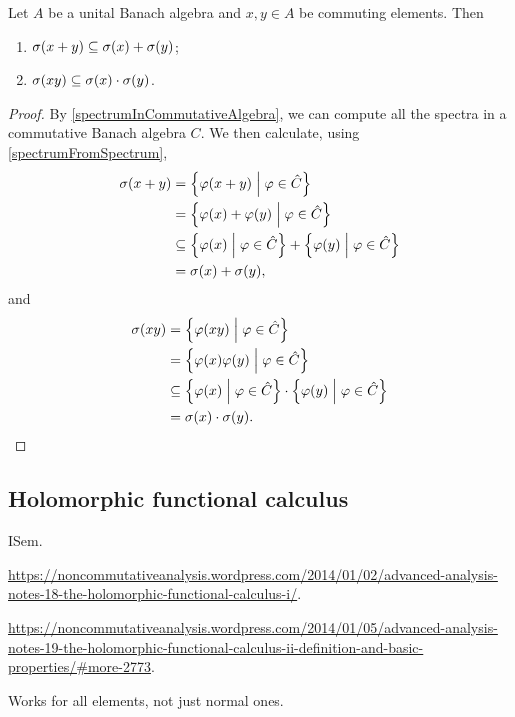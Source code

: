 \begin{proposition}
Let $A$ be a unital Banach algebra and $x,y\in A$ be commuting elements. Then
\begin{enumerate}
\item $\sigma(x+y) \subseteq \sigma(x) + \sigma(y)$;
\item $\sigma(xy) \subseteq \sigma(x) \cdot \sigma(y)$.
\end{enumerate}
\end{proposition}
\begin{proof}
By \ref{spectrumInCommutativeAlgebra}, we can compute all the spectra in a commutative Banach algebra $C$. We then calculate, using \ref{spectrumFromSpectrum},
\begin{align*}
\spec(x+y) &= \setbuilder{\varphi(x+y)}{\varphi\in \hat{C}} \\
&= \setbuilder{\varphi(x)+\varphi(y)}{\varphi\in \hat{C}} \\
&\subseteq \setbuilder{\varphi(x)}{\varphi\in \hat{C}} + \setbuilder{\varphi(y)}{\varphi\in \hat{C}} \\
&= \spec(x) + \spec(y),
\end{align*}
and
\begin{align*}
\spec(xy) &= \setbuilder{\varphi(xy)}{\varphi\in \hat{C}} \\
&= \setbuilder{\varphi(x)\varphi(y)}{\varphi\in \hat{C}} \\
&\subseteq \setbuilder{\varphi(x)}{\varphi\in \hat{C}} \cdot \setbuilder{\varphi(y)}{\varphi\in \hat{C}} \\
&= \spec(x) \cdot \spec(y).
\end{align*}
\end{proof}

\subsection{Holomorphic functional calculus}
ISem.

\url{https://noncommutativeanalysis.wordpress.com/2014/01/02/advanced-analysis-notes-18-the-holomorphic-functional-calculus-i/}.

\url{https://noncommutativeanalysis.wordpress.com/2014/01/05/advanced-analysis-notes-19-the-holomorphic-functional-calculus-ii-definition-and-basic-properties/#more-2773}.

Works for all elements, not just normal ones.

